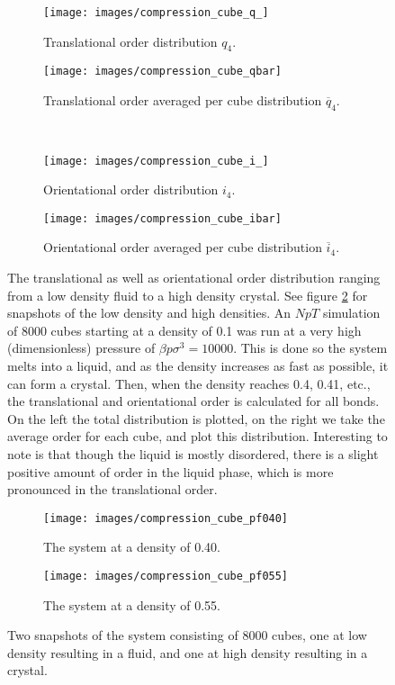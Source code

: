 \documentclass[thesis]{subfiles}
\begin{document}
\begin{figure}[h]
	\centering
	\begin{subfigure}{0.48\textwidth}
		\centering
		\texttt{[image: images/compression\_cube\_q\_]}
		\caption{Translational order distribution $q_4$.}
	\end{subfigure}
	\begin{subfigure}{0.51\textwidth}
		\centering
		\texttt{[image: images/compression\_cube\_qbar]}
		\caption{Translational order averaged per cube distribution $\overline q_4$.}
	\end{subfigure}\\\vspace{10pt}
	\begin{subfigure}{0.48\textwidth}
		\centering
		\texttt{[image: images/compression\_cube\_i\_]}
		\caption{Orientational order distribution $i_4$.}
	\end{subfigure}
	\begin{subfigure}{0.51\textwidth}
		\centering
		\texttt{[image: images/compression\_cube\_ibar]}
		\caption{Orientational order averaged per cube distribution $\overline i_4$.}
	\end{subfigure}
	\caption{The translational as well as orientational order distribution ranging from a low density fluid to a high density crystal. See figure \ref{fig:compression_cube_snapshots} for snapshots of the low density and high densities. An $NpT$ simulation of 8000 cubes starting at a density of 0.1 was run at a very high (dimensionless) pressure of $\beta p \sigma^3 = 10000$. This is done so the system melts into a liquid, and as the density increases as fast as possible, it can form a crystal. Then, when the density reaches 0.4, 0.41, etc., the translational and orientational order is calculated for all bonds. On the left the total distribution is plotted, on the right we take the average order for each cube, and plot this distribution.  Interesting to note is that though the liquid is mostly disordered, there is a slight positive amount of order in the liquid phase, which is more pronounced in the translational order.}
	\label{fig:compression_cube}
\end{figure}

\begin{figure}[h]
	{\centering
	\hfill
	\begin{subfigure}{0.4\textwidth}
		\centering
		\texttt{[image: images/compression\_cube\_pf040]}
		\caption{The system at a density of 0.40.}
	\end{subfigure}\hfill
	\begin{subfigure}{0.4\textwidth}
		\centering
		\texttt{[image: images/compression\_cube\_pf055]}
		\caption{The system at a density of 0.55.}
	\end{subfigure}
	\hfill}
	\caption{Two snapshots of the system consisting of 8000 cubes, one at low density resulting in a fluid, and one at high density resulting in a crystal.}
	\label{fig:compression_cube_snapshots}
\end{figure}
\end{document}
